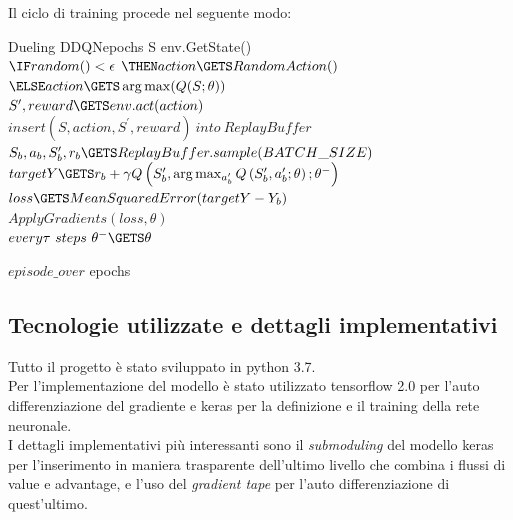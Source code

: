 \documentclass{article}
\begin{document}
		Il ciclo di training procede nel seguente modo:

		\begin{pseudocode}{Dueling DDQN}{epochs}
			\REPEAT
				S \GETS env.GetState() \\
				\REPEAT
					$\IF random() < \epsilon$
					$\THEN action \GETS RandomAction()$
					$\ELSE action \GETS \arg \max(Q(S; \theta))$ \\

					$S^{\prime}, reward \GETS env.act(action)$ \\
					$insert (S, action, S^{\prime}, reward)\ into\ ReplayBuffer$ \\

					$S_{b}, a_{b}, S_{b}^{\prime}, r_{b} \GETS ReplayBuffer.sample(BATCH\_SIZE)$ \\
					$targetY \GETS r_{b} + \gamma Q\left(S_{b}^{\prime}, \arg \max _{a_{b}^{\prime}} Q\left(S_{b}^{\prime}, a_{b}^{\prime} ; \theta\right) ; \theta^{-}\right)$ \\
					$loss \GETS MeanSquaredError(targetY - Y_{b})$ \\
					$ApplyGradients(loss, \theta)$ \\

					$every \tau\ steps\ \theta^{-} \GETS \theta$

				\UNTIL $episode\_over$
			\UNTIL epochs
		\end{pseudocode}

	\subsection{Tecnologie utilizzate e dettagli implementativi}
		Tutto il progetto è stato sviluppato in python 3.7. \\
		Per l'implementazione del modello è stato utilizzato tensorflow 2.0 per l'auto differenziazione del gradiente e keras per la definizione e il training della rete neuronale. \\
		I dettagli implementativi più interessanti sono il \textit{submoduling} del modello keras per l'inserimento in maniera trasparente dell'ultimo livello che combina i flussi di value e advantage, e l'uso del \textit{gradient tape} per l'auto differenziazione di quest'ultimo.

	\newpage
	{}
	
\end{document}
